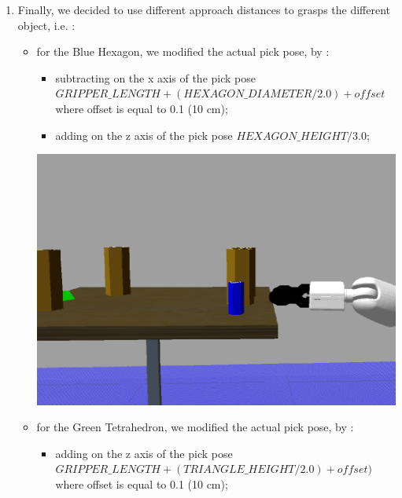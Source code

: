 \begin{enumerate}
    \item Finally, we decided to use different approach distances to grasps the different object, i.e. :
        \begin{itemize}
            \item for the Blue Hexagon, we modified the actual pick pose, by :
            \begin{itemize}
                \item subtracting on the x axis of the pick pose \\ $GRIPPER\_LENGTH + (HEXAGON\_DIAMETER / 2.0) + offset$ \\ where offset is equal to 0.1 (10 cm);
                \item adding on the z axis of the pick pose $HEXAGON\_HEIGHT / 3.0$;
            \end{itemize}
            \begin{center}
            \includegraphics[scale = 0.3]{images/manipulations/approBlue.png}    
            \end{center}
            \item for the Green Tetrahedron, we modified the actual pick pose, by :
            \begin{itemize}
                \item adding on the z axis of the pick pose \\ $GRIPPER\_LENGTH + (TRIANGLE\_HEIGHT / 2.0) + offset)$ \\ where offset is equal to 0.1 (10 cm);
            \end{itemize}        
            \begin{center}

\end{center}
\end{itemize}
\end{enumerate}
